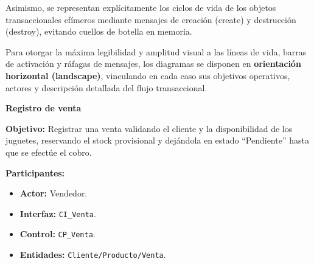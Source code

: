 \documentclass[12pt,a4paper]{article}
\begin{document}
Asimismo, se representan expl\'icitamente los ciclos de vida de los objetos transaccionales ef\'imeros mediante mensajes de creaci\'on (\guillemotleft create\guillemotright) y destrucci\'on (\guillemotleft destroy\guillemotright), evitando cuellos de botella en memoria.

Para otorgar la m\'axima legibilidad y amplitud visual a las l\'ineas de vida, barras de activaci\'on y r\'afagas de mensajes, los diagramas se disponen en \textbf{orientaci\'on horizontal (landscape)}, vinculando en cada caso sus objetivos operativos, actores y descripci\'on detallada del flujo transaccional.

\begin{landscape}
\singlespacing

\par\vspace{0.3cm}

\noindent\begin{minipage}[t]{0.40\linewidth}
\vspace{0pt}
\small \singlespacing \raggedright
\textbf{Registro de venta}

\medskip
\textbf{Objetivo:} Registrar una venta validando el cliente y la disponibilidad de los juguetes, reservando el stock provisional y dej\'andola en estado ``Pendiente'' hasta que se efect\'ue el cobro.

\medskip
\textbf{Participantes:}
\begin{itemize}\setlength{\itemsep}{1pt}\setlength{\parskip}{0pt}
  \item \textbf{Actor:} Vendedor.
  \item \textbf{Interfaz:} \texttt{CI\_Venta}.
  \item \textbf{Control:} \texttt{CP\_Venta}.
  \item \textbf{Entidades:} \texttt{Cliente/Producto/Venta}.
\end{itemize}


\end{minipage}
\end{landscape}
\end{document}
